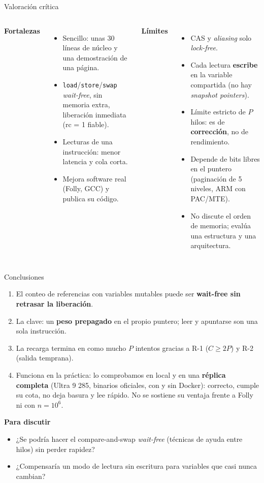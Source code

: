 \documentclass[aspectratio=169,11pt]{beamer}
\newcommand{\clave}[1]{\textcolor{acento}{\textbf{#1}}}
\begin{document}
\begin{frame}{Valoración crítica}
  \begin{columns}[T]
    \textbf{\textcolor{ok}{Fortalezas}}
    \begin{itemize}\small
      \item Sencillo: unas 30 líneas de núcleo y una demostración de una página.
      \item \texttt{load}/\texttt{store}/\texttt{swap} \emph{wait-free}, sin memoria extra, liberación inmediata (rc = 1 fiable).
      \item Lecturas de una instrucción: menor latencia y cola corta.
      \item Mejora software real (Folly, GCC) y publica su código.
    \end{itemize}
    \textbf{\textcolor{mal}{Límites}}
    \begin{itemize}\small
      \item CAS y \emph{aliasing} solo \emph{lock-free}.
      \item Cada lectura \textbf{escribe} en la variable compartida (no hay \emph{snapshot pointers}).
      \item Límite estricto de $P$ hilos: es de \textbf{corrección}, no de rendimiento.
      \item Depende de bits libres en el puntero (paginación de 5 niveles, ARM con PAC/MTE).
      \item No discute el orden de memoria; evalúa una estructura y una arquitectura.
    \end{itemize}
  \end{columns}
\end{frame}

\begin{frame}{Conclusiones}
  \begin{enumerate}\small
    \item El conteo de referencias con variables mutables puede ser \clave{wait-free sin retrasar la liberación}.
    \item La clave: un \textbf{peso prepagado} en el propio puntero; leer y apuntarse son una sola instrucción.
    \item La recarga termina en como mucho $P$ intentos gracias a R-1 ($C \ge 2P$) y R-2 (salida temprana).
    \item Funciona en la práctica: lo comprobamos en local y en una \textbf{réplica completa} (Ultra 9 285, binarios oficiales, con y sin Docker): correcto, cumple su cota, no deja basura y lee rápido. No se sostiene su ventaja frente a Folly ni con $n = 10^6$.
  \end{enumerate}
  \bigskip
  \textbf{Para discutir}
  \begin{itemize}\small
    \item ¿Se podría hacer el compare-and-swap \emph{wait-free} (técnicas de ayuda entre hilos) sin perder rapidez?
    \item ¿Compensaría un modo de lectura sin escritura para variables que casi nunca cambian?
  \end{itemize}
\end{frame}
\end{document}
